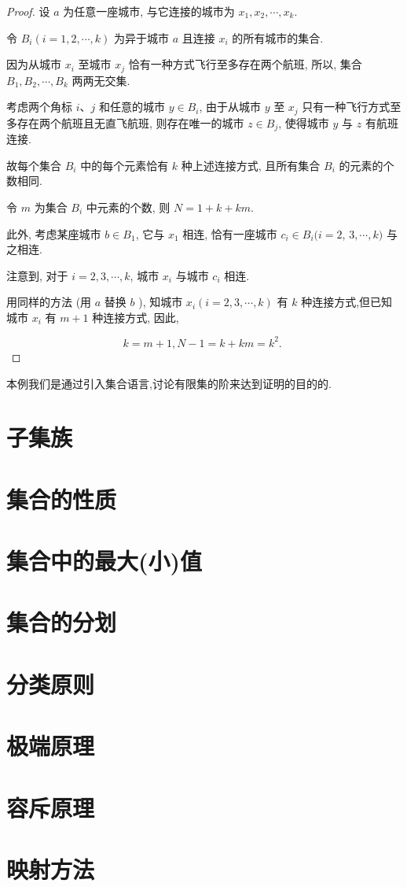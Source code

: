 \begin{proof}
	设 $a$ 为任意一座城市, 与它连接的城市为 $x_{1}, x_{2}, \cdots, x_{k}$.

	令 $B_{i}(i=1,2, \cdots, k)$ 为异于城市 $a$ 且连接 $x_{i}$ 的所有城市的集合.

	因为从城市 $x_{i}$ 至城市 $x_{j}$ 恰有一种方式飞行至多存在两个航班, 所以, 集合 $B_{1}, B_{2}, \cdots, B_{k}$ 两两无交集.

	考虑两个角标 $i 、 j$ 和任意的城市 $y \in B_{i}$, 由于从城市 $y$ 至 $x_{j}$ 只有一种飞行方式至多存在两个航班且无直飞航班, 则存在唯一的城市 $z \in B_{j}$, 使得城市 $y$ 与 $z$ 有航班连接.

	故每个集合 $B_{i}$ 中的每个元素恰有 $k$ 种上述连接方式, 且所有集合 $B_{i}$ 的元素的个数相同.

	令 $m$ 为集合 $B_{i}$ 中元素的个数, 则 $N=1+k+k m$.

	此外, 考虑某座城市 $b \in B_{1}$, 它与 $x_{1}$ 相连, 恰有一座城市 $c_{i} \in B_{i}(i=2$, $3, \cdots, k)$ 与之相连.

	注意到, 对于 $i=2,3, \cdots, k$, 城市 $x_{i}$ 与城市 $c_{i}$ 相连.

	用同样的方法 (用 $a$ 替换 $b$ ), 知城市 $x_{i}(i=2,3, \cdots, k)$ 有 $k$ 种连接方式,但已知城市 $x_{i}$ 有 $m+1$ 种连接方式, 因此,

	$$
		k=m+1, N-1=k+k m=k^{2} \text {. }
	$$
\end{proof}

\begin{note}
	本例我们是通过引入集合语言,讨论有限集的阶来达到证明的目的的.
\end{note}

\section{子集族}
\section{集合的性质}
\section{集合中的最大(小)值}
\section{集合的分划}
\section{分类原则}
\section{极端原理}
\section{ 容斥原理}
\section{ 映射方法}